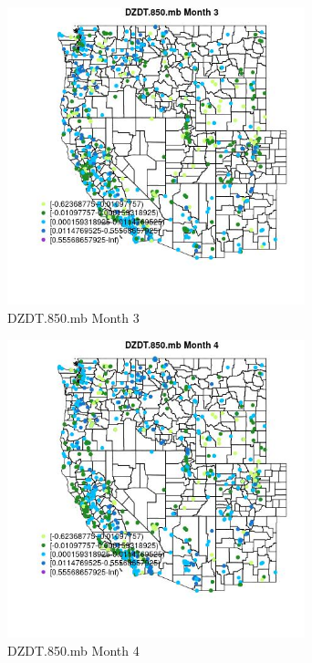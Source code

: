 \begin{figure} 
\centering  
\includegraphics[width=0.77\textwidth]{Code_Outputs/Report_ML_input_PM25_Step4_part_f_de_duplicated_aves_prioritize_24hr_obswNAs_MapObsMo3DZDT850mb.jpg} 
\caption{\label{fig:Report_ML_input_PM25_Step4_part_f_de_duplicated_aves_prioritize_24hr_obswNAsMapObsMo3DZDT850mb}DZDT.850.mb Month 3} 
\end{figure} 
 

\begin{figure} 
\centering  
\includegraphics[width=0.77\textwidth]{Code_Outputs/Report_ML_input_PM25_Step4_part_f_de_duplicated_aves_prioritize_24hr_obswNAs_MapObsMo4DZDT850mb.jpg} 
\caption{\label{fig:Report_ML_input_PM25_Step4_part_f_de_duplicated_aves_prioritize_24hr_obswNAsMapObsMo4DZDT850mb}DZDT.850.mb Month 4} 
\end{figure} 
 

